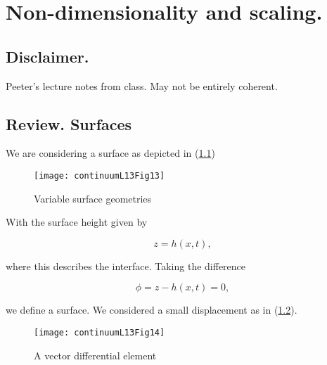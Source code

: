 %
%

\chapter{Non-dimensionality and scaling.}
\label{chap:continuumL14}
{}
\date{Mar 7, 2012}

\beginArtWithToc

\section{Disclaimer.}

Peeter's lecture notes from class.  May not be entirely coherent.

\section{Review.  Surfaces}

We are considering a surface as depicted in (\ref{fig:continuumL14:continuumL14Fig13})

\begin{figure}[htp]
   \centering
   \texttt{[image: continuumL13Fig13]}
   \caption{Variable surface geometries}\label{fig:continuumL14:continuumL14Fig13}
\end{figure}

With the surface height given by

\begin{equation}\label{eqn:continuumL14:10}
z = h(x, t),
\end{equation}

where this describes the interface.  Taking the difference

\begin{equation}\label{eqn:continuumL14:30}
\phi = z - h(x, t) = 0,
\end{equation}

we define a surface.  We considered a small displacement as in (\ref{fig:continuumL14:continuumL14Fig14}).

\begin{figure}[htp]
   \centering
   \texttt{[image: continuumL13Fig14]}
   \caption{A vector differential element}\label{fig:continuumL14:continuumL14Fig14}
\end{figure}

